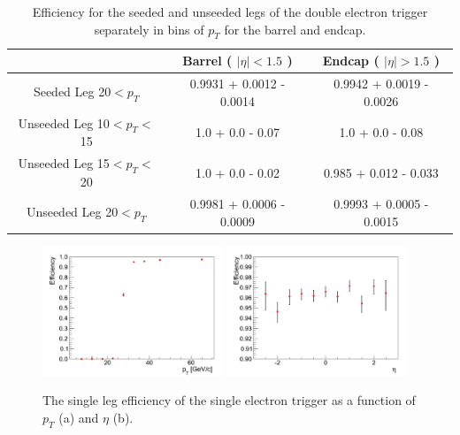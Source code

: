 \begin{table}[!ht]
\begin{center}
\begin{tabular}{c|c|c} \hline
              & Barrel ( $|\eta|<1.5$ )  & Endcap ( $|\eta|>1.5$ )  \\  \hline
\hline
Seeded Leg 20$<p_{T}$   & 0.9931 + 0.0012 - 0.0014 & 0.9942 + 0.0019 - 0.0026 \\ \hline
Unseeded Leg 10$<p_{T}<$15 & 1.0 + 0.0 - 0.07 & 1.0 + 0.0 - 0.08                 \\ \hline
Unseeded Leg 15$<p_{T}<$20 & 1.0 + 0.0 - 0.02 & 0.985 + 0.012 - 0.033            \\ \hline
Unseeded Leg 20$<p_{T}$   & 0.9981 + 0.0006 - 0.0009 & 0.9993 + 0.0005 - 0.0015 \\
\hline
\end{tabular}
\caption{Efficiency for the seeded and unseeded legs of the double electron trigger 
separately in bins of $p_{T}$ for the barrel and endcap.
\label{tab:eff_double_ele}}
\end{center}
\end{table}


\begin{figure}[!ht]
\begin{center}
\includegraphics[width=0.48\textwidth]{figures/ElectronTriggerEffVsPt_Ele27Tight.pdf}
\includegraphics[width=0.48\textwidth]{figures/ElectronTriggerEffVsEta_Ele27Tight.pdf}
\end{center}
\caption{The single leg efficiency of the single electron trigger as a function of $p_{T}$ (a) and $\eta$ (b).}
\label{fig:Ele27Efficiency}
\end{figure}


